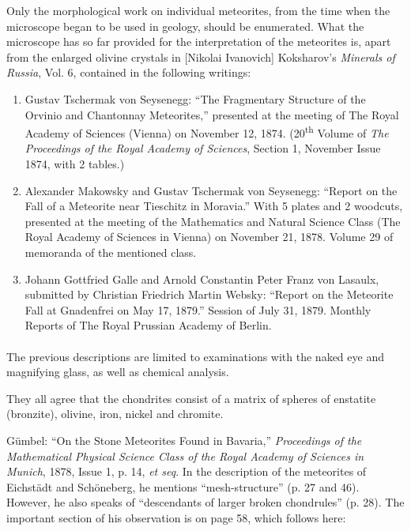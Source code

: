 \documentclass[a4paper, 12pt, oneside]{article}
\begin{document}
Only the morphological work on individual meteorites, from the time when the microscope began to be used in geology, should be enumerated. What the microscope has so far provided for the interpretation of the meteorites is, apart from the enlarged olivine crystals in [Nikolai Ivanovich] Koksharov's \emph{Minerals of Russia}, Vol. 6, contained in the following writings:
\begin{enumerate}
    \item Gustav Tschermak von Seysenegg: ``The Fragmentary Structure of the Orvinio and Chantonnay Meteorites,'' presented at the meeting of The Royal Academy of Sciences (Vienna) on November 12, 1874. (20\textsuperscript{th} Volume of \emph{The Proceedings of the Royal Academy of Sciences}, Section 1, November Issue 1874, with 2 tables.)
    \item Alexander Makowsky and Gustav Tschermak von Seysenegg: ``Report on the Fall of a Meteorite near Tieschitz in Moravia.'' With 5 plates and 2 woodcuts, presented at the meeting of the Mathematics and Natural Science Class (The Royal Academy of Sciences in Vienna) on November 21, 1878. Volume 29 of memoranda of the mentioned class.
    \item Johann Gottfried Galle and Arnold Constantin Peter Franz von Lasaulx, submitted by Christian Friedrich Martin Websky: ``Report on the Meteorite Fall at Gnadenfrei on May 17, 1879.'' Session of July 31, 1879. Monthly Reports of The Royal Prussian Academy of Berlin.
\end{enumerate}
\paragraph*{}
The previous descriptions are limited to examinations with the naked eye and magnifying glass, as well as chemical analysis.

They all agree that the chondrites consist of a matrix of spheres of enstatite (bronzite), olivine, iron, nickel and chromite.

Gümbel: ``On the Stone Meteorites Found in Bavaria,'' \emph{Proceedings of the Mathematical Physical Science Class of the Royal Academy of Sciences in Munich}, 1878, Issue 1, p. 14, \emph{et seq}. In the description of the meteorites of Eichstädt and Schöneberg, he mentions ``mesh-structure'' (p. 27 and 46). However, he also speaks of ``descendants of larger broken chondrules'' (p. 28). The important section of his observation is on page 58, which follows here:
\end{document}
